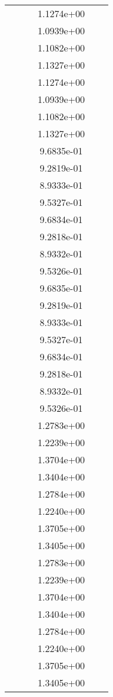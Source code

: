 \begin{xltabular}{\textwidth}{r|rS[table-format=1.3e+2]S[table-format=1.4e+2]S[table-format=1.4e+2]S[table-format=-1.5]}
&  &  & 1.1274e+00 & & \\
&  &  & 1.0939e+00 & & \\
&  &  & 1.1082e+00 & & \\
&  &  & 1.1327e+00 & & \\
&  &  & 1.1274e+00 & & \\
&  &  & 1.0939e+00 & & \\
&  &  & 1.1082e+00 & & \\
&  &  & 1.1327e+00 & & \\
&  &  & 9.6835e-01 & & \\
&  &  & 9.2819e-01 & & \\
&  &  & 8.9333e-01 & & \\
&  &  & 9.5327e-01 & & \\
&  &  & 9.6834e-01 & & \\
&  &  & 9.2818e-01 & & \\
&  &  & 8.9332e-01 & & \\
&  &  & 9.5326e-01 & & \\
&  &  & 9.6835e-01 & & \\
&  &  & 9.2819e-01 & & \\
&  &  & 8.9333e-01 & & \\
&  &  & 9.5327e-01 & & \\
&  &  & 9.6834e-01 & & \\
&  &  & 9.2818e-01 & & \\
&  &  & 8.9332e-01 & & \\
&  &  & 9.5326e-01 & & \\
&  &  & 1.2783e+00 & & \\
&  &  & 1.2239e+00 & & \\
&  &  & 1.3704e+00 & & \\
&  &  & 1.3404e+00 & & \\
&  &  & 1.2784e+00 & & \\
&  &  & 1.2240e+00 & & \\
&  &  & 1.3705e+00 & & \\
&  &  & 1.3405e+00 & & \\
&  &  & 1.2783e+00 & & \\
&  &  & 1.2239e+00 & & \\
&  &  & 1.3704e+00 & & \\
&  &  & 1.3404e+00 & & \\
&  &  & 1.2784e+00 & & \\
&  &  & 1.2240e+00 & & \\
&  &  & 1.3705e+00 & & \\
&  &  & 1.3405e+00 & & \\

\end{xltabular}
